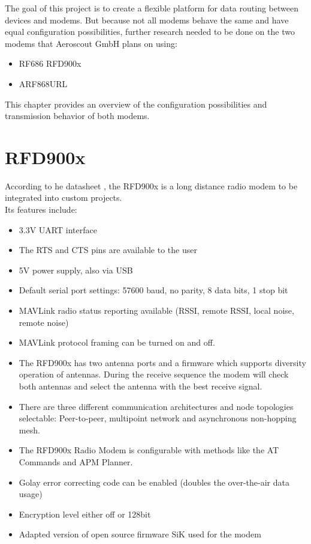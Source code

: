 %
The goal of this project is to create a flexible platform for data routing between devices and modems. But because not all modems behave the same and have equal configuration possibilities, further research needed to be done on the two modems that Aeroscout GmbH plans on using:
\begin{itemize}
    \item RF686 RFD900x
    \item ARF868URL
\end{itemize}
This chapter provides an overview of the configuration possibilities and transmission behavior of both modems.
%
%
%
%
\section{RFD900x}%
According to he datasheet \cite{RFD900x_Datasheet}, the RFD900x is a long distance radio modem to be integrated into custom projects.\\
Its features include: \begin{itemize}
    \item 3.3V UART interface
    \item The RTS and CTS pins are available to the user
    \item 5V power supply, also via USB
    \item Default serial port settings: 57600 baud, no parity, 8 data bits, 1 stop bit
    \item MAVLink radio status reporting available (RSSI, remote RSSI, local noise, remote noise)
    \item MAVLink protocol framing can be turned on and off.
    \item The RFD900x has two antenna ports and a firmware which supports diversity operation of antennas. During the receive sequence the modem will check both antennas and select the antenna with the best receive signal.
    \item There are three different communication architectures and node topologies selectable: Peer-to-peer, multipoint network and asynchronous non-hopping mesh.
    \item The RFD900x Radio Modem is configurable with methods like the AT Commands and APM Planner.
    \item Golay error correcting code can be enabled (doubles the over-the-air data usage)
    \item Encryption level either off or 128bit 
    \item Adapted version of open source firmware SiK used for the modem
\end{itemize}
%
%
